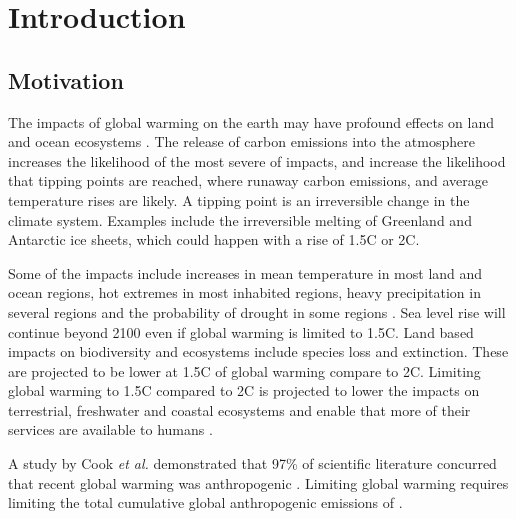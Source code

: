 
\chapter{Introduction}  %

\ifpdf
    \graphicspath{{Chapter1/Figs/Raster/}{Chapter1/Figs/PDF/}{Chapter1/Figs/}}
\else
    \graphicspath{{Chapter1/Figs/Vector/}{Chapter1/Figs/}}
\fi


\section{Motivation} %


The impacts of global warming on the earth may have profound effects on land and ocean ecosystems \cite{IPCC2018}. The release of carbon emissions into the atmosphere increases the likelihood of the most severe of impacts, and increase the likelihood that tipping points are reached, where runaway carbon emissions, and average temperature rises are likely. A tipping point is an irreversible change in the climate system. Examples include the irreversible melting of Greenland and Antarctic ice sheets, which could happen with a rise of 1.5\degree C or 2\degree C. 

Some of the impacts include increases in mean temperature in most land and ocean regions, hot extremes in most inhabited regions, heavy precipitation in several regions and the probability of drought in some regions \cite{IPCC2018}. Sea level rise will continue beyond 2100 even if global warming is limited to 1.5\degree C. Land based impacts on biodiversity and ecosystems include species loss and extinction. These are projected to be lower at 1.5\degree C of global warming compare to 2\degree C. Limiting global warming to 1.5\degree C compared to 2\degree C is projected to lower the impacts on terrestrial, freshwater and coastal ecosystems and enable that more of their services are available to humans \cite{IPCC2018}.

A study by Cook \textit{et al.} demonstrated that 97\% of scientific literature concurred that recent global warming was anthropogenic \cite{Cook2013}. Limiting global warming requires limiting the total cumulative global anthropogenic emissions of  \cite{Masson-Delmotte2018}. 

